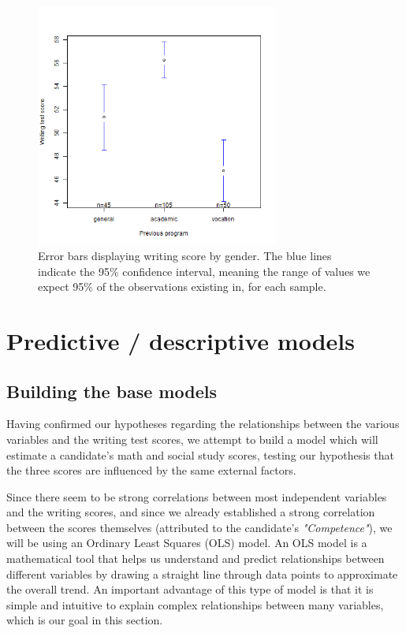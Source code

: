 \documentclass[10pt, a4paper]{article}
\begin{document}
	\begin{figure}
		\includegraphics[width=8cm]{write_prog_error_plot.png}
		\centering
		\caption{Error bars displaying writing score by gender. The blue lines indicate the 95\% confidence interval, meaning the range of values we expect 95\% of the observations existing in, for each sample.}
		\label{fig::write_prog_error}
	\end{figure}
	
	\section{Predictive / descriptive models}
	\label{sec::models}
	
	\subsection{Building the base models}
	\label{ssec:base_models}
	Having confirmed our hypotheses regarding the relationships between the various variables and the writing test scores, we attempt to build a model which will estimate a candidate's math and social study scores, testing our hypothesis that the three scores are influenced by the same external factors. 
	
	Since there seem to be strong correlations between most independent variables and the writing scores, and since we already established a strong correlation between the scores themselves (attributed to the candidate's \textit{"Competence"}), we will be using an Ordinary Least Squares (OLS) model. An OLS model is a mathematical tool that helps us understand and predict relationships between different variables by drawing a straight line through data points to approximate the overall trend. An important advantage of this type of model is that it is simple and intuitive to explain complex relationships between many variables, which is our goal in this section.
	
\end{document}
